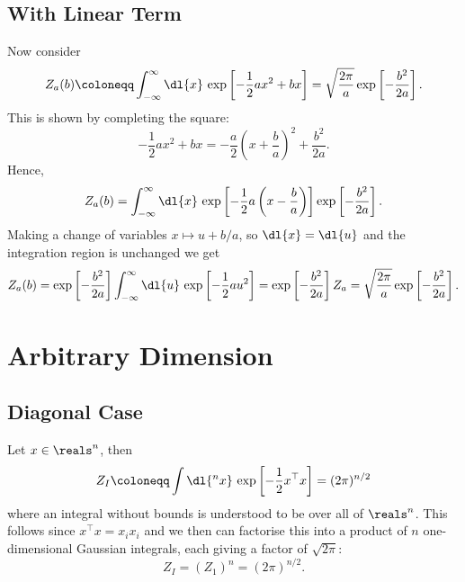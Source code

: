 \documentclass[fleqn]{NotesClass}
\newcommand{\trans}{{\top}}
\begin{document}
    \subsection{With Linear Term}
    Now consider
    \begin{equation}
        Z_a(b) \coloneqq \int_{-\infty}^{\infty} \dl{x} \, \exp\left[ -\frac{1}{2}ax^2 + bx \right] = \sqrt{\frac{2\pi}{a}} \exp\left[ -\frac{b^2}{2a} \right].
    \end{equation}
    This is shown by completing the square:
    \begin{equation}
        -\frac{1}{2}ax^2 + bx = -\frac{a}{2}\left( x + \frac{b}{a} \right)^2 + \frac{b^2}{2a}.
    \end{equation}
    Hence,
    \begin{equation}
        Z_a(b) = \int_{-\infty}^{\infty} \dl{x} \, \exp\left[ -\frac{1}{2}a\left( x - \frac{b}{a} \right) \right] \exp\left[ -\frac{b^2}{2a} \right].
    \end{equation}
    Making a change of variables \(x \mapsto u + b/a\), so \(\dl{x} = \dl{u}\) and the integration region is unchanged we get
    \begin{equation*}
        Z_a(b) = \exp\left[ -\frac{b^2}{2a} \right] \int_{-\infty}^{\infty} \dl{u} \, \exp\left[ -\frac{1}{2}au^2 \right] = \exp\left[ -\frac{b^2}{2a} \right] Z_a = \sqrt{\frac{2\pi}{a}} \exp\left[ -\frac{b^2}{2a} \right].
    \end{equation*}
    
    \section{Arbitrary Dimension}
    \subsection{Diagonal Case}
    Let \(x \in \reals^n\), then
    \begin{equation}
        Z_I \coloneqq \int \dl{^nx} \, \exp\left[ -\frac{1}{2}x^\trans x \right] = (2\pi)^{n/2}
    \end{equation}
    where an integral without bounds is understood to be over all of \(\reals^n\).
    This follows since \(x^\trans x = x_ix_i\) and we then can factorise this into a product of \(n\) one-dimensional Gaussian integrals, each giving a factor of \(\sqrt{2\pi}\):
    \begin{equation}
        Z_I = (Z_1)^n = (2\pi)^{n/2}.
    \end{equation}
    
\end{document}
